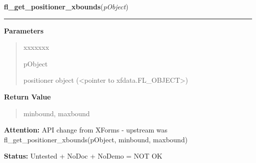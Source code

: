 \hspace{.8\funcindent}\begin{boxedminipage}{\funcwidth}

    \raggedright \textbf{fl\_get\_positioner\_xbounds}(\textit{pObject})

    \vspace{-1.5ex}

    \rule{\textwidth}{0.5\fboxrule}
\setlength{\parskip}{2ex}
\setlength{\parskip}{1ex}
      \textbf{Parameters}
      \vspace{-1ex}

      \begin{quote}
        \begin{Ventry}{xxxxxxx}

          \item[pObject]

          positioner object ({\textless}pointer to 
          xfdata.FL\_OBJECT{\textgreater})

        \end{Ventry}

      \end{quote}

      \textbf{Return Value}
    \vspace{-1ex}

      \begin{quote}
      minbound, maxbound

      \end{quote}

\textbf{Attention:} API change from XForms - upstream was fl\_get\_positioner\_xbounds(pObject,
minbound, maxbound)



\textbf{Status:} Untested + NoDoc + NoDemo = NOT OK



    \end{boxedminipage}

    \label{xformslib:library:fl_set_positioner_yvalue}

    \vspace{0.5ex}

